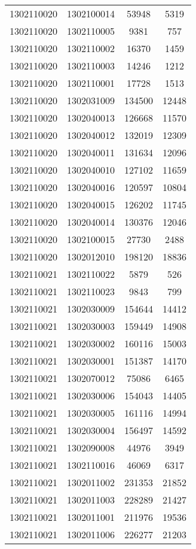 \begin{longtable}[h]{llcc}
		1302110020 & 1302100014 & 53948 & 5319\\
		1302110020 & 1302110005 & 9381 & 757\\
		1302110020 & 1302110002 & 16370 & 1459\\
		1302110020 & 1302110003 & 14246 & 1212\\
		1302110020 & 1302110001 & 17728 & 1513\\
		1302110020 & 1302031009 & 134500 & 12448\\
		1302110020 & 1302040013 & 126668 & 11570\\
		1302110020 & 1302040012 & 132019 & 12309\\
		1302110020 & 1302040011 & 131634 & 12096\\
		1302110020 & 1302040010 & 127102 & 11659\\
		1302110020 & 1302040016 & 120597 & 10804\\
		1302110020 & 1302040015 & 126202 & 11745\\
		1302110020 & 1302040014 & 130376 & 12046\\
		1302110020 & 1302100015 & 27730 & 2488\\
		1302110020 & 1302012010 & 198120 & 18836\\
		1302110021 & 1302110022 & 5879 & 526\\
		1302110021 & 1302110023 & 9843 & 799\\
		1302110021 & 1302030009 & 154644 & 14412\\
		1302110021 & 1302030003 & 159449 & 14908\\
		1302110021 & 1302030002 & 160116 & 15003\\
		1302110021 & 1302030001 & 151387 & 14170\\
		1302110021 & 1302070012 & 75086 & 6465\\
		1302110021 & 1302030006 & 154043 & 14405\\
		1302110021 & 1302030005 & 161116 & 14994\\
		1302110021 & 1302030004 & 156497 & 14592\\
		1302110021 & 1302090008 & 44976 & 3949\\
		1302110021 & 1302110016 & 46069 & 6317\\
		1302110021 & 1302011002 & 231353 & 21852\\
		1302110021 & 1302011003 & 228289 & 21427\\
		1302110021 & 1302011001 & 211976 & 19536\\
		1302110021 & 1302011006 & 226277 & 21203\\

\end{longtable}

